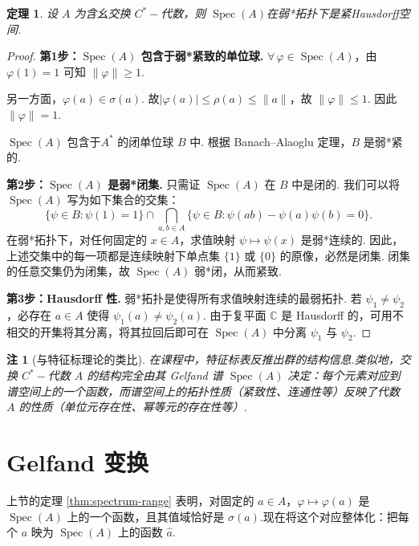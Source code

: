 \documentclass[math-font=lm, text-font=lm, math-style=TeX]{sjtureport}
\newtheorem{theorem}{定理}[chapter]
\newtheorem{remark}{注}[chapter]
\theoremstyle{plain}
\newtheorem*{proof}{证明}
\theoremstyle{plain}
\DeclareMathOperator{\Spec}{Spec}
\begin{document}
\begin{theorem}\label{thm:spec-compact}
    设 $A$ 为含幺交换 $C^*-\!$代数，则 $\Spec(A)$在弱*拓扑下是紧Hausdorff空间.
\end{theorem}
\begin{proof}
    \textbf{第1步：$\Spec(A)$ 包含于弱*紧致的单位球.} 
    $\forall\,\varphi \in \Spec(A)$，由 $\varphi(1) = 1$ 可知 $\|\varphi\| \ge 1$. \par
    另一方面，$\varphi(a) \in \sigma(a)$. 故$|\varphi(a)| \le \rho(a) \le \|a\|$，故 $\|\varphi\| \le 1$. 因此 $\|\varphi\| = 1$.\par
    $\Spec(A)$ 包含于$A^*$ 的闭单位球 $B$ 中. 根据 Banach--Alaoglu 定理，$B$ 是弱*紧的.

    \textbf{第2步：$\Spec(A)$ 是弱*闭集.} 
    只需证 $\Spec(A)$ 在 $B$ 中是闭的. 我们可以将 $\Spec(A)$ 写为如下集合的交集：
    \begin{equation*}
        \{\psi \in B : \psi(1) = 1\} \cap \bigcap_{a,b \in A} \{\psi \in B : \psi(ab) - \psi(a)\psi(b) = 0\}.
    \end{equation*}
    在弱*拓扑下，对任何固定的 $x \in A$，求值映射 $\psi \mapsto \psi(x)$  是弱*连续的. 因此，上述交集中的每一项都是连续映射下单点集 $\{1\}$ 或 $\{0\}$ 的原像，必然是闭集. 闭集的任意交集仍为闭集，故 $\Spec(A)$ 弱*闭，从而紧致.

    \textbf{第3步：Hausdorff 性.} 
    弱*拓扑是使得所有求值映射连续的最弱拓扑. 若 $\psi_1 \neq \psi_2$，必存在 $a \in A$ 使得 $\psi_1(a) \neq \psi_2(a)$. 由于复平面 $\mathbb{C}$ 是 Hausdorff 的，可用不相交的开集将其分离，将其拉回后即可在 $\Spec(A)$ 中分离 $\psi_1$ 与 $\psi_2$.
\end{proof}


\begin{remark}[与特征标理论的类比]
    在课程中，特征标表反推出群的结构信息.类似地，交换 $C^*-\!$代数 $A$ 的结构完全由其 Gelfand 谱 $\Spec(A)$ 决定：每个元素对应到谱空间上的一个函数，而谱空间上的拓扑性质（紧致性、连通性等）反映了代数 $A$ 的性质（单位元存在性、幂等元的存在性等）.
\end{remark}

\section{Gelfand 变换}

上节的定理 \ref{thm:spectrum-range} 表明，对固定的 $a \in A$，$\varphi \mapsto \varphi(a)$ 是 $\Spec(A)$ 上的一个函数，且其值域恰好是 $\sigma(a)$.现在将这个对应整体化：把每个 $a$ 映为 $\Spec(A)$ 上的函数 $\widehat{a}$.
\end{document}
